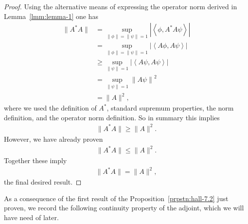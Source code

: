 \begin{proof}
Using the alternative means of expressing the operator norm derived in Lemma~\ref{lmm:lemma-1} one has
\begin{align}
    \|A^*A\| &= \sup\limits_{\|\phi\| = \|\psi\| = 1} \left\lvert \left< \phi, A^*A\psi \right> \right\rvert \\
             &= \sup\limits_{\|\phi\| = \|\psi\| = 1} \left\lvert \left< A\phi, A\psi \right> \right\rvert \\
             &\ge \sup\limits_{\|\psi\| = 1} \left\lvert \left< A\psi, A\psi \right> \right\rvert \\
             &= \sup\limits_{\|\psi\| = 1} \left\| A\psi \right\|^2 \\
             &= \|A\|^2,
\end{align}
where we used the definition of $A^*$, standard supremum properties, the norm definition, and the operator norm definition. So in summary this implies
\begin{align}
    \|A^*A\| \ge \|A\|^2.
\end{align}
However, we have already proven
\begin{align}
    \|A^*A\| \le \|A\|^2.
\end{align}
Together these imply
\begin{align}
    \|A^*A\| = \|A\|^2,
\end{align}
the final desired result.
\end{proof}

As a consequence of the first result of the Proposition~\ref{prpstn:hall-7.2} just proven, we record the following continuity property of the adjoint, which we will have need of later.

